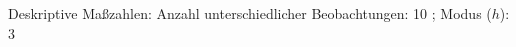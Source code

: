 				\label{tableValues:astu012e_g3}
				\vspace*{-\baselineskip}
                    \begin{noten}
                	    \note{} Deskriptive Maßzahlen:
                	    Anzahl unterschiedlicher Beobachtungen: 10%
                	    ; 
                	      Modus ($h$): 3
                     \end{noten}

